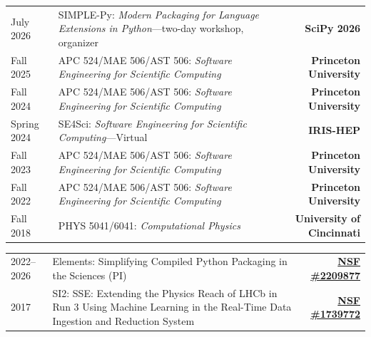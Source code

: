 \documentclass[10pt,letterpaper]{moderncv}
\begin{document}

\begin{tabularx}{\textwidth}{p{.8in}>{\raggedright\arraybackslash}X>{\bfseries}r}
    July 2026 & SIMPLE-Py: \textit{Modern Packaging for Language Extensions in Python}---two-day workshop, organizer & SciPy 2026 \\
    Fall 2025 & APC 524/MAE 506/AST 506: \textit{Software Engineering for Scientific Computing} & Princeton University \\
    Fall 2024 & APC 524/MAE 506/AST 506: \textit{Software Engineering for Scientific Computing} & Princeton University \\
    Spring 2024 & SE4Sci: \textit{Software Engineering for Scientific Computing}---Virtual & IRIS-HEP \\
    Fall 2023 & APC 524/MAE 506/AST 506: \textit{Software Engineering for Scientific Computing} & Princeton University \\
    Fall 2022 & APC 524/MAE 506/AST 506: \textit{Software Engineering for Scientific Computing} & Princeton University \\
    Fall 2018 & PHYS 5041/6041: \textit{Computational Physics} & University of Cincinnati \\
\end{tabularx}

\begin{tabularx}{\textwidth}{p{.8in}>{\raggedright\arraybackslash}X>{\bfseries}r}
    2022--2026 & Elements: Simplifying Compiled Python Packaging in the Sciences (PI) & \href{https://nsf.gov/awardsearch/showAward?AWD_ID=2209877}{NSF \#2209877} \\
    2017 & SI2\@: SSE\@: Extending the Physics Reach of LHCb in Run 3 Using Machine Learning in the Real-Time Data Ingestion and Reduction System & \href{https://nsf.gov/awardsearch/showAward?AWD_ID=1739772}{NSF \#1739772} \\ %
\end{tabularx}
\end{document}

